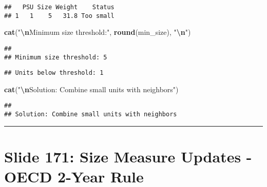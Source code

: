 \documentclass[
]{article}
\newenvironment{Shaded}{\begin{snugshade}}{\end{snugshade}}
\newcommand{\FunctionTok}[1]{\textcolor[rgb]{0.13,0.29,0.53}{\textbf{#1}}}
\newcommand{\NormalTok}[1]{#1}
\newcommand{\SpecialCharTok}[1]{\textcolor[rgb]{0.81,0.36,0.00}{\textbf{#1}}}
\newcommand{\StringTok}[1]{\textcolor[rgb]{0.31,0.60,0.02}{#1}}
\begin{document}
\begin{verbatim}
##   PSU Size Weight    Status
## 1   1    5   31.8 Too small
\end{verbatim}

\begin{Shaded}
\begin{Highlighting}[]
\FunctionTok{cat}\NormalTok{(}\StringTok{"}\SpecialCharTok{\textbackslash{}n}\StringTok{Minimum size threshold:"}\NormalTok{, }\FunctionTok{round}\NormalTok{(min\_size), }\StringTok{"}\SpecialCharTok{\textbackslash{}n}\StringTok{"}\NormalTok{)}
\end{Highlighting}
\end{Shaded}

\begin{verbatim}
## 
## Minimum size threshold: 5
\end{verbatim}

\begin{Shaded}
\end{Shaded}

\begin{verbatim}
## Units below threshold: 1
\end{verbatim}

\begin{Shaded}
\begin{Highlighting}[]
\FunctionTok{cat}\NormalTok{(}\StringTok{"}\SpecialCharTok{\textbackslash{}n}\StringTok{Solution: Combine small units with neighbors"}\NormalTok{)}
\end{Highlighting}
\end{Shaded}

\begin{verbatim}
## 
## Solution: Combine small units with neighbors
\end{verbatim}

\begin{center}\rule{0.5\linewidth}{0.5pt}\end{center}

\section{Slide 171: Size Measure Updates - OECD 2-Year
Rule}\label{slide-171-size-measure-updates---oecd-2-year-rule}
\end{document}
